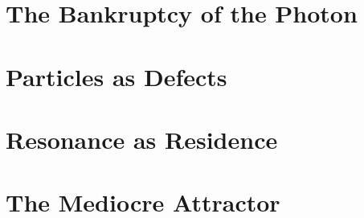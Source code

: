 \documentclass[11pt,a4paper,twoside]{book}
\begin{document}
\chapter{The Bankruptcy of the Photon}







\chapter{Particles as Defects}




\chapter{Resonance as Residence}








\chapter{The Mediocre Attractor}



\end{document}
